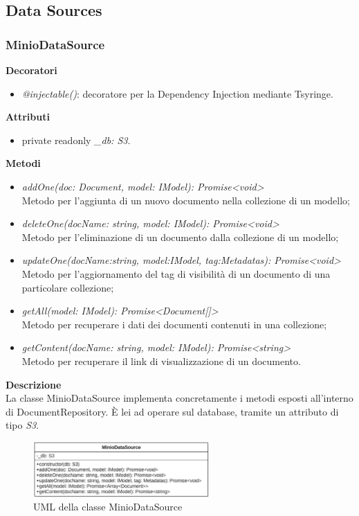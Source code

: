 \subsection{Data Sources} \label{subsec:datasources}
\subsubsection{MinioDataSource}
\textbf{Decoratori}
\begin{itemize}
    \item \textit{@injectable()}: decoratore per la Dependency Injection mediante Tsyringe.
\end{itemize}
\textbf{Attributi}
\begin{itemize}
    \item private readonly \textit{\_db: S3}.
\end{itemize}
\textbf{Metodi}
\begin{itemize}[itemsep=-4pt]
    \item \textit{addOne(doc: Document, model: IModel): Promise<void>}\\
    Metodo per l'aggiunta di un nuovo documento nella collezione di un modello;
    \item \textit{deleteOne(docName: string, model: IModel): Promise<void>}\\
    Metodo per l'eliminazione di un documento dalla collezione di un modello;
    \item \textit{updateOne(docName:string, model:IModel, tag:Metadatas): Promise<void>}\\
    Metodo per l'aggiornamento del tag di visibilità di un documento di una particolare collezione;
    \item \textit{getAll(model: IModel): Promise<Document[]>}\\
    Metodo per recuperare i dati dei documenti contenuti in una collezione;
    \item \textit{getContent(docName: string, model: IModel): Promise<string>}\\
    Metodo per recuperare il link di visualizzazione di un documento.
\end{itemize}
\textbf{Descrizione}\\
La classe MinioDataSource implementa concretamente i metodi esposti all'interno di DocumentRepository. È lei ad operare sul database, tramite un attributo di tipo \textit{S3}.

\begin{figure}[h!]
    \centering  
    \includegraphics[width=0.6\textwidth]{MinioDataSource.png}
    \caption{UML della classe MinioDataSource}
\end{figure}

